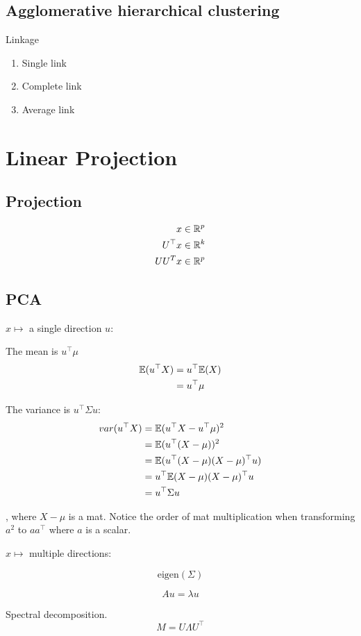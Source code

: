 \documentclass[a4paper]{report}
\begin{document}
\section{Agglomerative hierarchical clustering}
Linkage
\begin{enumerate}
\item Single link
\item Complete link 
\item Average link 
\end{enumerate}


\chapter{Linear Projection}
\section{Projection}
\begin{align*}
x &\in \mathbb{R}^p\\
U^\top x &\in \mathbb{R}^k \\
UU^Tx &\in \mathbb{R}^p
\end{align*}

\section{PCA}
$x \mapsto$ a single direction $u$:

The mean is $u^\top\mu$
\begin{align*}
\mathbb{E}(u^\top X) &= u^\top \mathbb{E}(X) \\
&= u^\top \mu
\end{align*}

The variance is $u^\top \Sigma u$:
\begin{align*}
var(u^\top X) &= \mathbb{E}(u^\top X-u^\top \mu)^2\\
&= \mathbb{E}(u^\top(X-\mu))^2\\
&= \mathbb{E}(u^\top(X-\mu)(X-\mu)^\top u)\\
&= u^\top \mathbb{E}(X-\mu)(X-\mu)^\top u  \\
&= u^\top \Sigma u
\end{align*}

, where $X-\mu$ is a mat. Notice the order of mat multiplication when transforming $a^2$ to $aa^\top$ where $a$ is a scalar.

$x \mapsto$ multiple directions:

$$
\text{eigen}(\Sigma)
$$

$$
Au = \lambda u
$$

Spectral decomposition. 
$$
M = U\Lambda U^\top
$$
\end{document}
